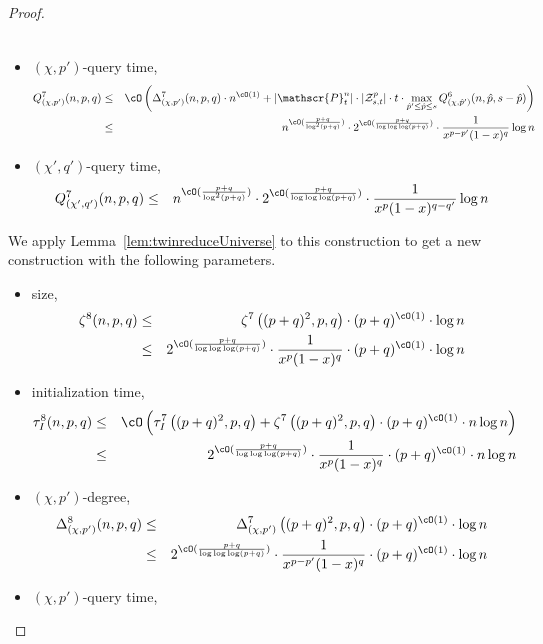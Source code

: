 \begin{proof}
\begin{itemize}
\begin{eqnarray*}
\end{eqnarray*}
\item $(\chi,p')$-query time, 
\begin{eqnarray*}
Q_{(\chi,p')}^7(n,p,q) &\leq& \cO\left(\Delta_{(\chi,p')}^7(n,p,q) \cdot n^{\cO(1)} + |\mathscr{P}_{t}^{n}|\cdot |{\cal Z}_{s,t}^{p}|\cdot t \cdot 
\max_{\hat{p}'\leq \hat{p} \leq s } Q_{(\chi,\hat{p}')}^6(n,\hat{p},s-\hat{p}) \right)\\
&\leq& n^{\cO(\frac{p+q}{\log^2(p+q)})}\cdot  2^{\cO(\frac{p+q}{\log\log\log(p+q)})} \cdot \frac{1}{x^{p-p'}(1-x)^q}\log n 
\end{eqnarray*}
\item $(\chi',q')$-query time,
\begin{eqnarray*}
 Q_{(\chi',q')}^7(n,p,q) 
&\leq& n^{\cO(\frac{p+q}{\log^2(p+q)})}\cdot  2^{\cO(\frac{p+q}{\log\log\log(p+q)})} \cdot \frac{1}{x^{p}(1-x)^{q-q'}}\log n 
\end{eqnarray*}
\end{itemize}
We apply Lemma~\ref{lem:twinreduceUniverse} to this construction to get a new construction with the following parameters.
\begin{itemize} \item size, 
\begin{eqnarray*}
\zeta^8(n,p,q) &\leq& \zeta^7\left((p+q)^2,p,q\right) \cdot  (p+q)^{\cO(1)} \cdot \log n\\
&\leq & 2^{\cO(\frac{p+q}{\log\log\log(p+q)})}\cdot \frac{1}{x^p(1-x)^q}\cdot (p+q)^{\cO(1)} \cdot \log n
\end{eqnarray*}
\item initialization time, 
\begin{eqnarray*}
\tau_I^8(n,p,q) &\leq& \cO\left(\tau_I^7\left((p+q)^2,p,q\right) + \zeta^7\left((p+q)^2,p,q\right) \cdot (p+q)^{\cO(1)} \cdot n \log n\right)\\
&\leq & 2^{\cO(\frac{p+q}{\log\log\log(p+q)})}\cdot \frac{1}{x^p(1-x)^q}\cdot (p+q)^{\cO(1)} \cdot n\log n
\end{eqnarray*}
\item $(\chi,p')$-degree, 
\begin{eqnarray*}
\Delta_{(\chi,p')}^8(n,p,q) &\leq& \Delta_{(\chi,p')}^7\left((p+q)^2,p,q\right) \cdot  (p+q)^{\cO(1)} \cdot \log n \\
&\leq & 2^{\cO(\frac{p+q}{\log\log\log(p+q)})}\cdot \frac{1}{x^{p-p'}(1-x)^q}\cdot (p+q)^{\cO(1)} \cdot \log n
\end{eqnarray*}
\item $(\chi,p')$-query time,

\end{itemize}
\end{proof}
